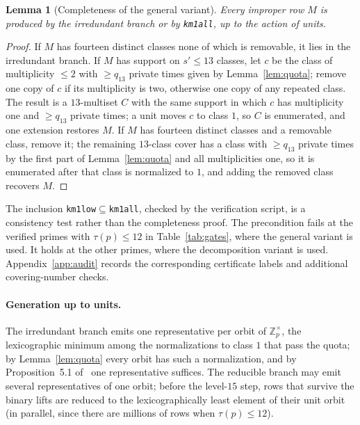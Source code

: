 \documentclass[11pt]{article}
\newtheorem{lemma}[theorem]{Lemma}
\theoremstyle{definition}
\theoremstyle{remark}
\newcommand{\Z}{\mathbb{Z}}
\begin{document}
\begin{lemma}[Completeness of the general variant]\label{lem:km1all}
Every improper row $M$ is produced by the irredundant branch or by
\texttt{km1all}, up to the action of units.
\end{lemma}

\begin{proof}
If $M$ has fourteen distinct classes none of which is removable, it lies
in the irredundant branch.  If $M$ has support on $s'\leq13$ classes, let
$c$ be the class of multiplicity $\leq2$ with $\geq q_{13}$ private times
given by Lemma~\ref{lem:quota}; remove one copy of $c$ if its
multiplicity is two, otherwise one copy of any repeated class.  The
result is a $13$-multiset $C$ with the same support in which $c$ has
multiplicity one and $\geq q_{13}$ private times; a unit moves $c$ to
class $1$, so $C$ is enumerated, and one extension restores $M$.  If $M$
has fourteen distinct classes and a removable class, remove it; the
remaining $13$-class cover has a class with $\geq q_{13}$ private times by
the first part of Lemma~\ref{lem:quota} and all multiplicities one, so it
is enumerated after that class is normalized to $1$, and adding the
removed class recovers $M$.
\end{proof}

The inclusion \texttt{km1low}$\subseteq$\texttt{km1all}, checked by the
verification script, is a consistency test rather than the completeness
proof.  The precondition fails at the \NearGcdCount{} verified primes with
$\tau(p)\leq12$ in Table~\ref{tab:gates}, where the general variant is used.  It
holds at the other \NoNearGcdCount{} primes, where the decomposition
variant is used.  Appendix~\ref{app:audit} records the corresponding
certificate labels and additional covering-number checks.

\paragraph{Generation up to units.}
The irredundant branch emits one representative per orbit of
$\Z_p^{\times}$, the lexicographic minimum among the normalizations to
class $1$ that pass the quota; by Lemma~\ref{lem:quota} every orbit has
such a normalization, and by Proposition~5.1 of~\cite{ST26} one
representative suffices.  The reducible branch may emit several
representatives of one orbit; before the level-$15$ step, rows that survive
the binary lifts are reduced to the lexicographically least element of
their unit orbit
(in parallel, since there are millions of rows when $\tau(p)\leq12$).
\end{document}
